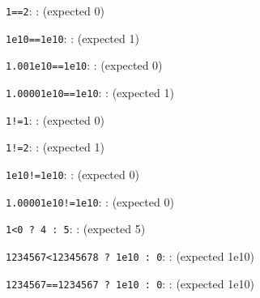\documentclass{article}
\begin{document}
\verb|1==2|:
	:
	\pgfmathresult (expected 0)

\verb|1e10==1e10|:
	:
	\pgfmathresult (expected 1)

\verb|1.001e10==1e10|:
	:
	\pgfmathresult (expected 0)

\verb|1.00001e10==1e10|:
	:
	\pgfmathresult (expected 1)

\verb|1!=1|:
	:
	\pgfmathresult (expected 0)

\verb|1!=2|:
	:
	\pgfmathresult (expected 1)

\verb|1e10!=1e10|:
	:
	\pgfmathresult (expected 0)

\verb|1.00001e10!=1e10|:
	:
	\pgfmathresult (expected 0)

\verb|1<0 ? 4 : 5|:
	:
	\pgfmathresult (expected 5)

\verb|1234567<12345678 ? 1e10 : 0|:
	:
	\pgfmathresult (expected 1e10)

\verb|1234567==1234567 ? 1e10 : 0|:
	:
	\pgfmathresult (expected 1e10)
\end{document}
